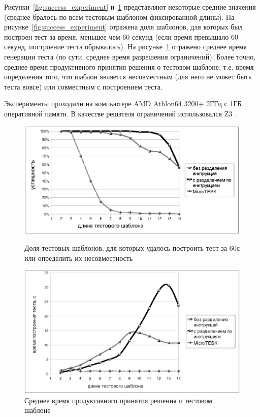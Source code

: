 Рисунки~\ref{fig:success_experiment} и~\ref{fig:time_experiment} представляют
некоторые средние значения (среднее бралось по всем тестовым шаблоном
фиксированной длины). На рисунке~\ref{fig:success_experiment} отражена доля
шаблонов, для которых был построен тест за время, меньшее чем 60 секунд (если
время превышало 60 секунд, построение теста обрывалось). На
рисунке~\ref{fig:time_experiment} отражено среднее время генерации теста (по
сути, среднее время разрешения ограничений). Более точно, среднее время
продуктивного принятия решения о тестовом шаблоне, т.е. время определения того,
что шаблон является несовместным (для него не может быть теста вовсе) или
совместным с построением теста.

Эксперименты проходили на компьютере AMD Athlon64 3200+ 2ГГц с 1ГБ оперативной
памяти. В качестве решателя ограничений использовался Z3~\cite{Z3}.

\begin{figure}[p] \center
\parbox[t]{\textwidth}{
  \includegraphics[width=\textwidth]{4.analysis/success_exprmnt}%
\caption{Доля тестовых шаблонов, для которых удалось построить тест за 60с или
определить их несовместность}\label{fig:success_experiment}
}

\vspace{1.5cm}

\parbox[t]{\textwidth}{
  \includegraphics[width=\textwidth]{4.analysis/time_exprmnt}
  \caption{Среднее время продуктивного принятия решения о тестовом
шаблоне}\label{fig:time_experiment}
}
\end{figure}

